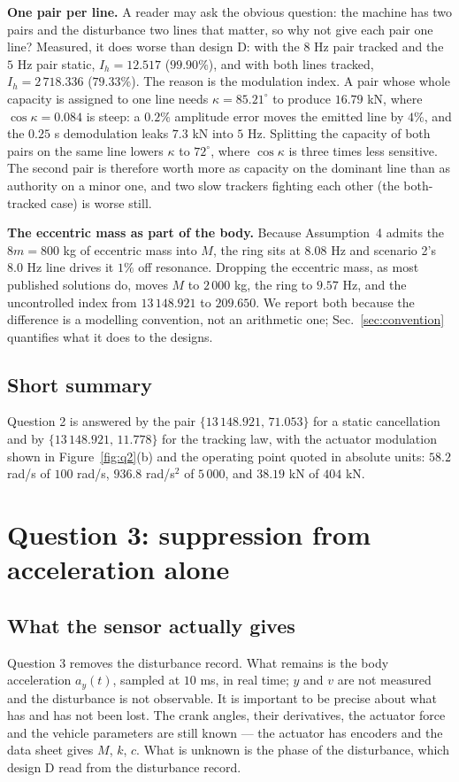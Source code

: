 \documentclass[12pt]{apmcmthesis}
\begin{document}
\textbf{One pair per line.} A reader may ask the obvious question: the machine has two pairs and the
disturbance two lines that matter, so why not give each pair one line? Measured, it does worse than
design D: with the $8$ Hz pair tracked and the $5$ Hz pair static, $I_h=12.517$ ($99.90\%$), and with
both lines tracked, $I_h=2\,718.336$ ($79.33\%$). The reason is the modulation index. A pair whose
whole capacity is assigned to one line needs $\kappa=85.21^{\circ}$ to produce $16.79$ kN, where
$\cos\kappa=0.084$ is steep: a $0.2\%$ amplitude error moves the emitted line by $4\%$, and the
$0.25$ s demodulation leaks $7.3$ kN into $5$ Hz. Splitting the capacity of both pairs on the same
line lowers $\kappa$ to $72^{\circ}$, where $\cos\kappa$ is three times less sensitive. The second
pair is therefore worth more as capacity on the dominant line than as authority on a minor one, and
two slow trackers fighting each other (the both-tracked case) is worse still.

\textbf{The eccentric mass as part of the body.} Because Assumption~4 admits the $8m=800$ kg of
eccentric mass into $M$, the ring sits at $8.08$ Hz and scenario 2's $8.0$ Hz line drives it $1\%$
off resonance. Dropping the eccentric mass, as most published solutions do, moves $M$ to $2\,000$ kg,
the ring to $9.57$ Hz, and the uncontrolled index from $13\,148.921$ to $209.650$. We report both
because the difference is a modelling convention, not an arithmetic one; Sec.~\ref{sec:convention}
quantifies what it does to the designs.

\subsection{Short summary}
Question 2 is answered by the pair $\{13\,148.921,\,71.053\}$ for a static cancellation and by
$\{13\,148.921,\,11.778\}$ for the tracking law, with the actuator modulation shown in
Figure~\ref{fig:q2}(b) and the operating point quoted in absolute units: $58.2$ rad/s of
$100$ rad/s, $936.8$ rad/s$^2$ of $5\,000$, and $38.19$ kN of $404$ kN.

\section{Question 3: suppression from acceleration alone}
\label{sec:q3}
\subsection{What the sensor actually gives}
Question 3 removes the disturbance record. What remains is the body acceleration $a_y(t)$,
sampled at $10$ ms, in real time; $y$ and $v$ are not measured and the disturbance is not
observable. It is important to be precise about what has and has not been lost. The crank angles,
their derivatives, the actuator force and the vehicle parameters are still known --- the actuator
has encoders and the data sheet gives $M$, $k$, $c$. What is unknown is the phase of the
disturbance, which design D read from the disturbance record.
\end{document}
